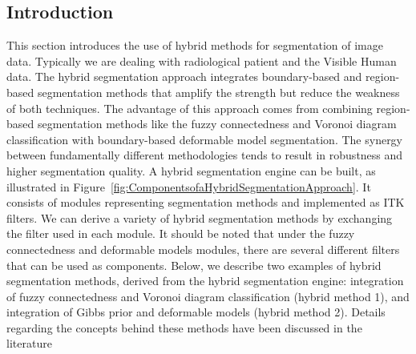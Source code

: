 %
%
% 
%
%
%

\subsection{Introduction}
\label{sec:HybridSegmentationIntroduction}
This section introduces the use of hybrid methods for segmentation of image
data. Typically we are dealing with radiological patient and the Visible
Human data. The hybrid segmentation approach integrates boundary-based and
region-based segmentation methods that amplify the strength but reduce the
weakness of both techniques. The advantage of this approach comes from
combining region-based segmentation methods like the fuzzy connectedness and
Voronoi diagram classification with boundary-based deformable model
segmentation. The synergy between fundamentally different methodologies tends
to result in robustness and higher segmentation quality.  A hybrid
segmentation engine can be built, as illustrated in
Figure~\ref{fig:ComponentsofaHybridSegmentationApproach}. It consists of
modules representing segmentation methods and implemented as ITK filters. We
can derive a variety of hybrid segmentation methods by exchanging the filter
used in each module. It should be noted that under the fuzzy connectedness
and deformable models modules, there are several different filters that can
be used as components. Below, we describe two examples of hybrid segmentation
methods, derived from the hybrid segmentation engine: integration of fuzzy
connectedness and Voronoi diagram classification (hybrid method 1), and
integration of Gibbs prior and deformable models (hybrid method 2).  Details
regarding the concepts behind these methods have been discussed in the
literature
\cite{Angelini2002,Udupa2002,Jin2002,Imielinska2001,Imielinska2000a,Imielinska2000b}



